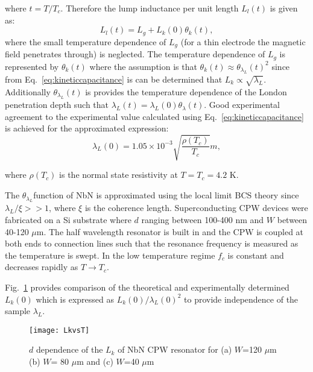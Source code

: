 \noindent where $t = T/T_{c}$. Therefore the lump inductance per unit length $L_{l}(t)$ is given as: 
\begin{equation}
\label{eq:templumpinductance}
L_{l}(t)=L_{g}+L_{k}(0) \theta_{k}(t),
\end{equation}
\noindent where the small temperature dependence of $L_{g}$ (for a thin electrode the magnetic field penetrates through) is neglected. The temperature dependence of $L_{g}$ is represented by $\theta_{k}(t)$ where the assumption is that  $\theta_{k} (t) \approx \theta_{\lambda_{L}} (t) ^{2}$ since from Eq.~\ref{eq:kineticcapacitance} is can be determined that $L_{k} \propto \sqrt{\lambda_{L}}$. Additionally  $\theta_{\lambda_{L}} (t)$ is provides the temperature dependence of the London penetration depth such that $\lambda_{L}(t) = \lambda_{L}(0) \theta_{\lambda}(t)$. Good experimental agreement to the experimental value calculated using Eq.~\ref{eq:kineticcapacitance} is achieved for the approximated expression:
\begin{equation}
\label{eq:tempLondonpentration}
\lambda_{L}(0) = 1.05 \times 10^{-3}\sqrt{\frac{\rho(T_{c})}{T_{c}}}m,
\end{equation} 

\noindent where $\rho(T_{c})$ is the normal state resistivity at $T=T_{c}=4.2$ K.

The $\theta_{\lambda_{L}}$function of NbN is approximated using the local limit BCS theory since $\lambda_{L}/\xi>> 1 $, where $\xi$ is the coherence length. Superconducting CPW devices were fabricated on a Si substrate where $d$ ranging between 100-400 nm and $W$ between 40-120 $\mu$m. The half wavelength resonator is built in and the CPW is coupled at both ends to connection lines such that the resonance frequency is measured as the temperature is swept. In the low temperature regime $f_{c}$ is constant and decreases rapidly as $T \rightarrow T_{c}$. 

Fig.~\ref{fig:LkvsT} provides comparison of the theoretical and experimentally determined $L_{k}(0)$ which is expressed as $L_{k}(0)/\lambda_{L}(0)^{2}$ to provide independence of the sample $\lambda_{L}$. 

\begin{figure}[h]
\centering
\texttt{[image: LkvsT]}
\caption{\label{fig:LkvsT} $d$ dependence of the $L_{k}$ of NbN CPW resonator for (a) $W$=120 $\mu$m (b) $W$= 80 $\mu$m and (c) $W$=40 $\mu$m \citep{1347-4065-33-10R-5708}}
\end{figure}

